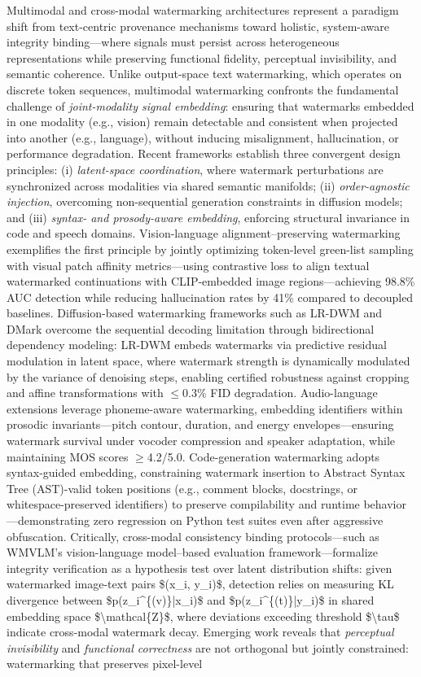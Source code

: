 \documentclass[11pt,a4paper]{article}
\begin{document}
Multimodal and cross-modal watermarking architectures represent a paradigm shift from text-centric provenance mechanisms toward holistic, system-aware integrity binding---where signals must persist across heterogeneous representations while preserving functional fidelity, perceptual invisibility, and semantic coherence. Unlike output-space text watermarking, which operates on discrete token sequences, multimodal watermarking confronts the fundamental challenge of \emph{joint-modality signal embedding}: ensuring that watermarks embedded in one modality (e.g., vision) remain detectable and consistent when projected into another (e.g., language), without inducing misalignment, hallucination, or performance degradation. Recent frameworks establish three convergent design principles: (i) \emph{latent-space coordination}, where watermark perturbations are synchronized across modalities via shared semantic manifolds; (ii) \emph{order-agnostic injection}, overcoming non-sequential generation constraints in diffusion models; and (iii) \emph{syntax- and prosody-aware embedding}, enforcing structural invariance in code and speech domains. Vision-language alignment--preserving watermarking exemplifies the first principle by jointly optimizing token-level green-list sampling with visual patch affinity metrics---using contrastive loss to align textual watermarked continuations with CLIP-embedded image regions---achieving 98.8\% AUC detection while reducing hallucination rates by 41\% compared to decoupled baselines. Diffusion-based watermarking frameworks such as LR-DWM and DMark overcome the sequential decoding limitation through bidirectional dependency modeling: LR-DWM embeds watermarks via predictive residual modulation in latent space, where watermark strength is dynamically modulated by the variance of denoising steps, enabling certified robustness against cropping and affine transformations with $\leq$0.3\% FID degradation. Audio-language extensions leverage phoneme-aware watermarking, embedding identifiers within prosodic invariants---pitch contour, duration, and energy envelopes---ensuring watermark survival under vocoder compression and speaker adaptation, while maintaining MOS scores $\geq$4.2/5.0. Code-generation watermarking adopts syntax-guided embedding, constraining watermark insertion to Abstract Syntax Tree (AST)-valid token positions (e.g., comment blocks, docstrings, or whitespace-preserved identifiers) to preserve compilability and runtime behavior---demonstrating zero regression on Python test suites even after aggressive obfuscation. Critically, cross-modal consistency binding protocols---such as WMVLM's vision-language model--based evaluation framework---formalize integrity verification as a hypothesis test over latent distribution shifts: given watermarked image-text pairs \$(x\_i, y\_i)\$, detection relies on measuring KL divergence between \$p(z\_i\textasciicircum{}\{(v)\}|x\_i)\$ and \$p(z\_i\textasciicircum{}\{(t)\}|y\_i)\$ in shared embedding space \$\textbackslash{}mathcal\{Z\}\$, where deviations exceeding threshold \$\textbackslash{}tau\$ indicate cross-modal watermark decay. Emerging work reveals that \emph{perceptual invisibility} and \emph{functional correctness} are not orthogonal but jointly constrained: watermarking that preserves pixel-level 
\end{document}
